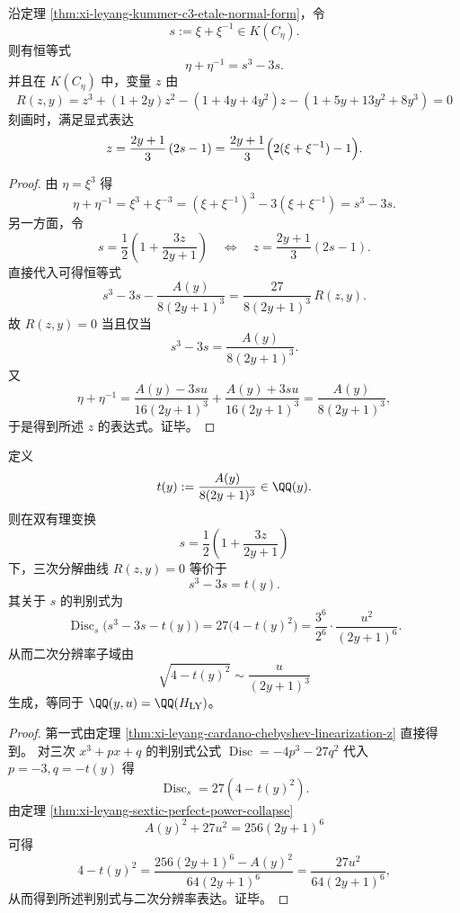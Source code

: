 \begin{theorem}\label{thm:xi-leyang-cardano-chebyshev-linearization-z}
沿定理 \ref{thm:xi-leyang-kummer-c3-etale-normal-form}，令
\[
s:=\xi+\xi^{-1}\in K(C_\eta).
\]
则有恒等式
\[
\eta+\eta^{-1}=s^3-3s.
\]
并且在 \(K(C_\eta)\) 中，变量 \(z\) 由
\[
R(z,y)=z^3+(1+2y)z^2-(1+4y+4y^2)z-(1+5y+13y^2+8y^3)=0
\]
刻画时，满足显式表达
\[
z=\frac{2y+1}{3}\,(2s-1)=\frac{2y+1}{3}\Bigl(2(\xi+\xi^{-1})-1\Bigr).
\]
\end{theorem}
\begin{proof}
由 \(\eta=\xi^3\) 得
\[
\eta+\eta^{-1}=\xi^3+\xi^{-3}=(\xi+\xi^{-1})^3-3(\xi+\xi^{-1})=s^3-3s.
\]
另一方面，令
\[
s=\frac12\left(1+\frac{3z}{2y+1}\right)
\quad\Longleftrightarrow\quad
z=\frac{2y+1}{3}(2s-1).
\]
直接代入可得恒等式
\[
s^3-3s-\frac{A(y)}{8(2y+1)^3}
=\frac{27}{8(2y+1)^3}\,R(z,y).
\]
故 \(R(z,y)=0\) 当且仅当
\[
s^3-3s=\frac{A(y)}{8(2y+1)^3}.
\]
又
\[
\eta+\eta^{-1}
=\frac{A(y)-3su}{16(2y+1)^3}+\frac{A(y)+3su}{16(2y+1)^3}
=\frac{A(y)}{8(2y+1)^3},
\]
于是得到所述 \(z\) 的表达式。证毕。
\end{proof}

\begin{corollary}\label{cor:xi-leyang-chebyshev-normal-form-and-discriminant-recovery}
定义
\[
t(y):=\frac{A(y)}{8(2y+1)^3}\in\QQ(y).
\]
则在双有理变换
\[
s=\frac12\left(1+\frac{3z}{2y+1}\right)
\]
下，三次分解曲线 \(R(z,y)=0\) 等价于
\[
s^3-3s=t(y).
\]
其关于 \(s\) 的判别式为
\[
\operatorname{Disc}_s\bigl(s^3-3s-t(y)\bigr)=27\bigl(4-t(y)^2\bigr)
=\frac{3^6}{2^6}\cdot\frac{u^2}{(2y+1)^6}.
\]
从而二次分辨率子域由
\[
\sqrt{4-t(y)^2}\sim \frac{u}{(2y+1)^3}
\]
生成，等同于 \(\QQ(y,u)=\QQ(H_{\mathrm{LY}})\)。
\end{corollary}
\begin{proof}
第一式由定理 \ref{thm:xi-leyang-cardano-chebyshev-linearization-z} 直接得到。
对三次 \(x^3+px+q\) 的判别式公式
\(
\operatorname{Disc}= -4p^3-27q^2
\)
代入 \(p=-3,q=-t(y)\) 得
\[
\operatorname{Disc}_s=27(4-t(y)^2).
\]
由定理 \ref{thm:xi-leyang-sextic-perfect-power-collapse}
\[
A(y)^2+27u^2=256(2y+1)^6
\]
可得
\[
4-t(y)^2
=\frac{256(2y+1)^6-A(y)^2}{64(2y+1)^6}
=\frac{27u^2}{64(2y+1)^6},
\]
从而得到所述判别式与二次分辨率表达。证毕。
\end{proof}

